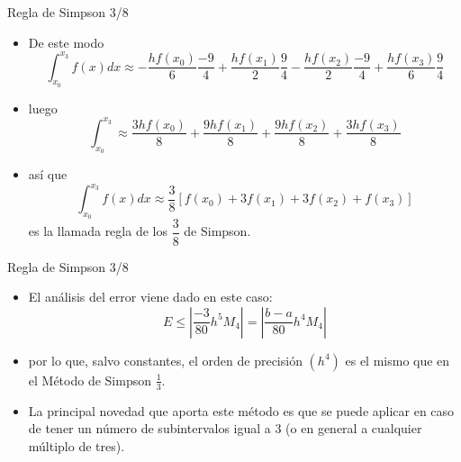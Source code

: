 \documentclass[12pt]{beamer}
\begin{document}
\begin{frame}{Regla de Simpson 3/8}
  \begin{itemize}
    \item De este modo
    $$
    \int_{x_0}^{x_3}f(x)dx \approx -\dfrac{hf(x_0)}{6}\dfrac{-9}{4} + \dfrac{hf(x_1)}{2}\dfrac{9}{4} - \dfrac{hf(x_2)}{2}\dfrac{-9}{4} + \dfrac{hf(x_3)}{6}\dfrac{9}{4}
    $$
    \item<2->luego
    $$
    \int_{x_0}^{x_3} \approx \dfrac{3hf(x_0)}{8} + \dfrac{9hf(x_1)}{8} + \dfrac{9hf(x_2)}{8} + \dfrac{3hf(x_3)}{8}
    $$
    \item<3-> as\'i que 
    $$
    \int_{x_0}^{x_3}f(x)dx \approx \dfrac{3}{8}\left[f(x_0)+3f(x_1)+3f(x_2)+f(x_3)\right]
    $$
    es la llamada regla de los $\dfrac{3}{8}$ de Simpson.
  \end{itemize}
\end{frame}
\begin{frame}{Regla de Simpson 3/8}
  \begin{itemize}
    \item El an\'alisis del error viene dado en este caso:
    $$
    E \leq \left|\frac{-3}{80}h^5M_4\right| = \left|\frac{b-a}{80}h^4M_4\right|
    $$
    \item<2-> por lo que, salvo constantes, el orden de precisi\'on $(h^4)$ es el mismo que en el M\'etodo de Simpson $\frac{1}{3}$.
    \item<3-> La principal novedad que aporta este m\'etodo es que se puede aplicar  en caso de tener un n\'umero de subintervalos
    igual a 3 (o en general a cualquier m\'ultiplo de tres).
  \end{itemize}
\end{frame}
\end{document}
